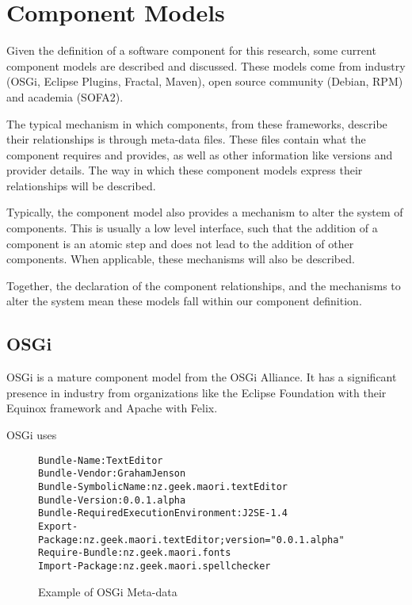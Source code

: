 \section{Component Models}
Given the definition of a software component for this research, some current component models are described and discussed.
These models come from industry (OSGi, Eclipse Plugins, Fractal, Maven), open source community (Debian, RPM) and academia (SOFA2).

The typical mechanism in which components, from these frameworks, describe their relationships is through meta-data files.
These files contain what the component requires and provides, as well as other information like versions and provider details.
The way in which these component models express their relationships will be described.

Typically, the component model also provides a mechanism to alter the system of components.
This is usually a low level interface, such that the addition of a component is an atomic step and does not lead to the addition of other components.
When applicable, these mechanisms will also be described.

Together, the declaration of the component relationships, and the mechanisms to alter the system mean these models fall within our component definition.

\subsection{OSGi} 
OSGi is a mature component model from the OSGi Alliance.
It has a significant presence in industry \cite{Kriens2008} from organizations like the Eclipse Foundation with their Equinox framework and Apache with Felix.

OSGi uses

\begin{figure}[htp]
\begin{center}
\begin{alltt}
Bundle-Name: TextEditor
Bundle-Vendor: Graham Jenson
Bundle-SymbolicName: nz.geek.maori.textEditor
Bundle-Version: 0.0.1.alpha
Bundle-RequiredExecutionEnvironment: J2SE-1.4
Export-Package: nz.geek.maori.textEditor;version="0.0.1.alpha"
Require-Bundle: nz.geek.maori.fonts
Import-Package: nz.geek.maori.spellchecker
\end{alltt}
  \caption[OSGi Meta-data]{Example of OSGi Meta-data}
  \label{osgibundle}
\end{center}
\end{figure}

